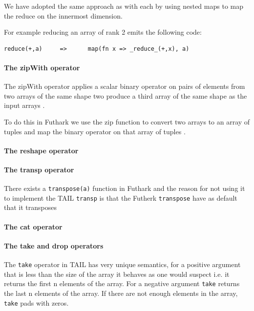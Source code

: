 \documentclass[11pt]{article}
\begin{document}
We have adopted the same approach as with each by using nested maps to map the reduce on the innermost dimension.
 
For example reducing an array of rank 2 emits the following code:
 
\begin{lstlisting}[numbers=none,frame=none]
reduce(+,a)     =>      map(fn x => _reduce_(+,x), a)
\end{lstlisting}
\paragraph{The zipWith operator}
The zipWith operator applies a scalar binary operator on pairs of elements from two arrays of the same shape two
produce a third array of the same shape as the input arrays \cite{ElsmanDybdal:Array:2014}.
 
To do this in Futhark we use the zip function to convert two arrays to an array of tuples and map the binary operator on that array of tuples \cite{TroelsHenriksen}.
\paragraph{The reshape operator} 

\paragraph{The transp operator} 
There exists a {\tt transpose(a)} function in Futhark and the reason for not using it to implement the TAIL {\tt transp} is that the Futherk {\tt transpose} have as default that it transposes 

\paragraph{The cat operator} 

\paragraph{The take and drop operators} 
The {\tt take} operator in TAIL has very unique semantics, for a positive argument that is less than the size of the array it behaves as one would suspect i.e. it returns the first n elements of the array.
For a negative argument {\tt take} returns the last n elements of the array.
If there are not enough elements in the array, {\tt take} pads with zeros.
\end{document}
